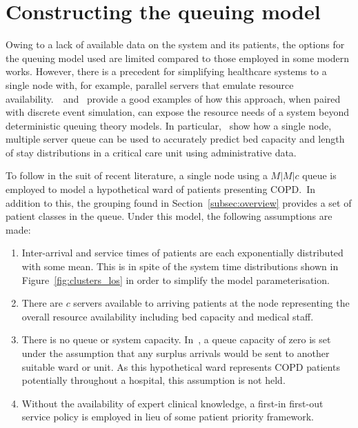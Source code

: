 \section{Constructing the queuing model}\label{sec:wasserstein}


Owing to a lack of available data on the system and its patients, the options
for the queuing model used are limited compared to those employed in some modern
works. However, there is a precedent for simplifying healthcare systems to a
single node with, for example, parallel servers that emulate resource
availability.~\cite{Steins2013}~and~\cite{Williams2015} provide a good examples
of how this approach, when paired with discrete event simulation, can expose the
resource needs of a system beyond deterministic queuing theory models. In
particular,~\citeauthor{Williams2015} show how a single node, multiple server
queue can be used to accurately predict bed capacity and length of stay
distributions in a critical care unit using administrative data.

To follow in the suit of recent literature, a single node using a \(M|M|c\)
queue is employed to model a hypothetical ward of patients presenting COPD.\ In
addition to this, the grouping found in Section~\ref{subsec:overview} provides
a set of patient classes in the queue. Under this model, the following
assumptions are made:
\begin{enumerate}
    \item Inter-arrival and service times of patients are each exponentially
        distributed with some mean. This is in spite of the system time
        distributions shown in Figure~\ref{fig:clusters_los} in order to
        simplify the model parameterisation.
    \item There are $c$ servers available to arriving patients at the node
        representing the overall resource availability including bed capacity
        and medical staff.
    \item There is no queue or system capacity. In~\cite{Williams2015}, a
        queue capacity of zero is set under the assumption that any surplus
        arrivals would be sent to another suitable ward or unit. As this
        hypothetical ward represents COPD patients potentially throughout a
        hospital, this assumption is not held.
    \item Without the availability of expert clinical knowledge, a first-in
        first-out service policy is employed in lieu of some patient priority 
        framework.
\end{enumerate}

